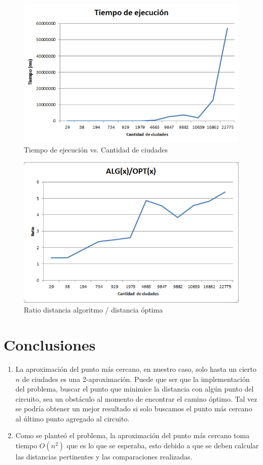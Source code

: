\documentclass[12pt,letterpaper, margin = 3cm]{article}
\begin{document}
 \begin{figure}[ht!]
 \centering
 \includegraphics[scale=0.7]{img/timeclosest.png}
 \caption{Tiempo de ejecución vs. Cantidad de ciudades}
 \end{figure}
 
  \begin{figure}[ht!]
 \centering
 \includegraphics[scale=0.7]{img/ratioclosest.png}
 \caption{Ratio distancia algoritmo / distancia óptima}
 \end{figure}


\newpage
\section{Conclusiones}
\begin{enumerate} 
\item La aproximación del punto más cercano, en nuestro caso, solo hasta un cierto $n$ de ciudades es una 2-aproximación. Puede que ser que la implementación del problema, buscar el punto que minimice la distancia con algún punto del circuito, sea un obstáculo al momento de encontrar el camino óptimo. Tal vez se podría obtener un mejor resultado si solo buscamos el punto más cercano al último punto agregado al circuito.
\item Como se planteó el problema, la aproximación del punto más cercano toma tiempo $O(n^2)$ que es lo que se esperaba, esto debido a que se deben calcular las distancias pertinentes y las comparaciones realizadas.

\end{enumerate}
\end{document}
